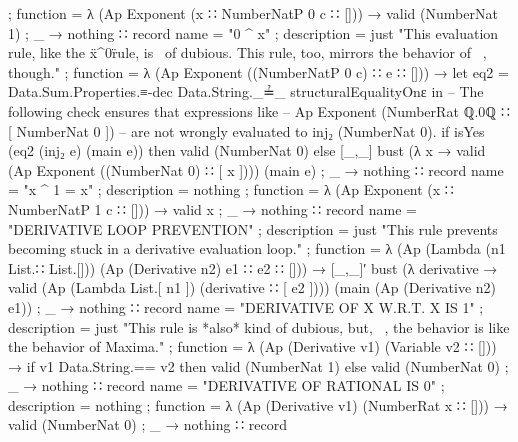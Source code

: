 \documentclass{report}
\begin{document}
\begin{code}
{          ; function =
            λ { (Ap Exponent (x ∷ NumberNatP 0 c ∷ [])) → valid (NumberNat 1)
              ; _ → nothing}
          }
      ∷ record
          { name = "0 ^ x"
          ; description = just
            "This evaluation rule, like the \"x^0\" rule, is \
            \kind of dubious.  This rule, too, mirrors the behavior of \
            \Maxima, though."
          ; function =
            λ { (Ap Exponent ((NumberNatP 0 c) ∷ e ∷ [])) →
                 let eq2 = Data.Sum.Properties.≡-dec Data.String._≟_
                                                     structuralEqualityOnε in
                 -- The following check ensures that expressions like
                 -- Ap Exponent (NumberRat ℚ.0ℚ ∷ [ NumberNat 0 ])
                 -- are not wrongly evaluated to inj₂ (NumberNat 0).
                 if isYes (eq2 (inj₂ e) (main e))
                    then valid (NumberNat 0)
                    else [_,_] bust
                               (λ x → valid (Ap Exponent ((NumberNat 0) ∷ [ x ])))
                               (main e)
              ; _ → nothing}
          }
      ∷ record
          { name = "x ^ 1 = x"
          ; description = nothing
          ; function =
            λ { (Ap Exponent (x ∷ NumberNatP 1 c ∷ [])) → valid x
              ; _ → nothing}
          }
      ∷ record
          { name = "DERIVATIVE LOOP PREVENTION"
          ; description = just
            "This rule prevents becoming stuck in a derivative evaluation loop."
          ; function =
            λ { (Ap (Lambda (n1 List.∷ List.[])) (Ap (Derivative n2) e1 ∷ e2 ∷ [])) →
                [_,_]′ bust
                       (λ derivative → valid (Ap (Lambda List.[ n1 ])
                                                 (derivative ∷ [ e2 ])))
                       (main (Ap (Derivative n2) e1))
              ; _ → nothing}
          }
      ∷ record
          { name = "DERIVATIVE OF X W.R.T. X IS 1"
          ; description = just
            "This rule is *also* kind of dubious, but, \
            \again, the behavior is like the behavior of Maxima."
          ; function =
            λ { (Ap (Derivative v1) (Variable v2 ∷ [])) →
                if v1 Data.String.== v2
                  then valid (NumberNat 1)
                  else valid (NumberNat 0)
              ; _ → nothing}
          }
      ∷ record
          { name = "DERIVATIVE OF RATIONAL IS 0"
          ; description = nothing
          ; function =
            λ { (Ap (Derivative v1) (NumberRat x ∷ [])) →
                valid (NumberNat 0)
              ; _ → nothing}
          }
      ∷ record

\end{code}
\end{document}
